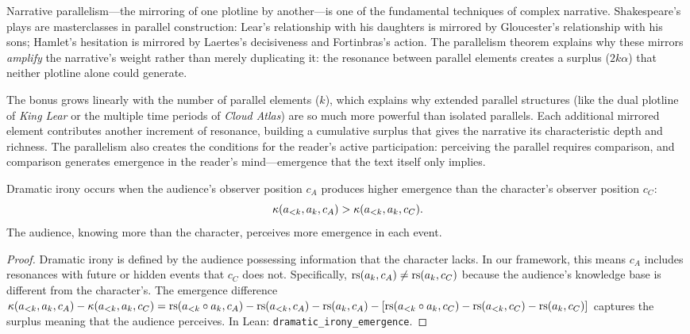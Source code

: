\begin{interpretation}
\label{interp:subplot}
Narrative parallelism---the mirroring of one plotline by another---is one of the fundamental techniques of complex narrative.  Shakespeare's plays are masterclasses in parallel construction: Lear's relationship with his daughters is mirrored by Gloucester's relationship with his sons; Hamlet's hesitation is mirrored by Laertes's decisiveness and Fortinbras's action.  The parallelism theorem explains why these mirrors \emph{amplify} the narrative's weight rather than merely duplicating it: the resonance between parallel elements creates a surplus ($2k\alpha$) that neither plotline alone could generate.

The bonus grows linearly with the number of parallel elements ($k$), which explains why extended parallel structures (like the dual plotline of \textit{King Lear} or the multiple time periods of \textit{Cloud Atlas}) are so much more powerful than isolated parallels.  Each additional mirrored element contributes another increment of resonance, building a cumulative surplus that gives the narrative its characteristic depth and richness.  The parallelism also creates the conditions for the reader's active participation: perceiving the parallel requires comparison, and comparison generates emergence in the reader's mind---emergence that the text itself only implies.
\end{interpretation}

\begin{theorem}
\label{thm:dramatic-irony}
Dramatic irony occurs when the audience's observer position $c_A$ produces higher emergence than the character's observer position $c_C$:
\[
  \kappa(a_{<k}, a_k, c_A) > \kappa(a_{<k}, a_k, c_C).
\]
The audience, knowing more than the character, perceives more emergence in each event.
\end{theorem}

\begin{proof}
Dramatic irony is defined by the audience possessing information that the character lacks.  In our framework, this means $c_A$ includes resonances with future or hidden events that $c_C$ does not.  Specifically, $\mathrm{rs}(a_k, c_A) \neq \mathrm{rs}(a_k, c_C)$ because the audience's knowledge base is different from the character's.  The emergence difference $\kappa(a_{<k}, a_k, c_A) - \kappa(a_{<k}, a_k, c_C) = \mathrm{rs}(a_{<k} \circ a_k, c_A) - \mathrm{rs}(a_{<k}, c_A) - \mathrm{rs}(a_k, c_A) - [\mathrm{rs}(a_{<k} \circ a_k, c_C) - \mathrm{rs}(a_{<k}, c_C) - \mathrm{rs}(a_k, c_C)]$ captures the surplus meaning that the audience perceives.  In Lean: \texttt{dramatic\_irony\_emergence}.
\end{proof}

